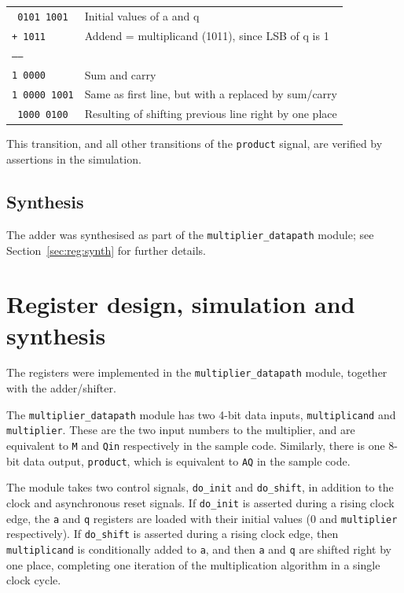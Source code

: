 \documentclass[a4paper]{article}
\begin{document}
\vspace{10pt}
\begin{tabular}{ll}
\texttt{  0101 1001} & Initial values of a and q \\
\texttt{+ 1011     } & Addend = multiplicand (1011), since LSB of q is 1 \\
\texttt{------     } & \\
\texttt{1 0000     } & Sum and carry \\
\texttt{1 0000 1001} & Same as first line, but with a replaced by sum/carry \\
\texttt{  1000 0100} & Resulting of shifting previous line right by one place \\
\end{tabular}
\vspace{10pt}

This transition, and all other transitions of the \texttt{product} signal, are verified by assertions in the simulation.

\subsection{Synthesis}
\label{sec:adder:synth}

The adder was synthesised as part of the \texttt{multiplier\_datapath} module; see Section~\ref{sec:reg:synth} for further details.

\section{Register design, simulation and synthesis}
\label{seg:reg}

The registers were implemented in the \texttt{multiplier\_datapath} module, together with the adder/shifter.

The \texttt{multiplier\_datapath} module has two 4-bit data inputs, \texttt{multiplicand} and \texttt{multiplier}. These are the two input numbers to the multiplier, and are equivalent to \texttt{M} and \texttt{Qin} respectively in the sample code. Similarly, there is one 8-bit data output, \texttt{product}, which is equivalent to \texttt{AQ} in the sample code.

The module takes two control signals, \texttt{do\_init} and \texttt{do\_shift}, in addition to the clock and asynchronous reset signals. If \texttt{do\_init} is asserted during a rising clock edge, the \texttt{a} and \texttt{q} registers are loaded with their initial values (0 and \texttt{multiplier} respectively). If \texttt{do\_shift} is asserted during a rising clock edge, then \texttt{multiplicand} is conditionally added to \texttt{a}, and then \texttt{a} and \texttt{q} are shifted right by one place, completing one iteration of the multiplication algorithm in a single clock cycle.
\end{document}
